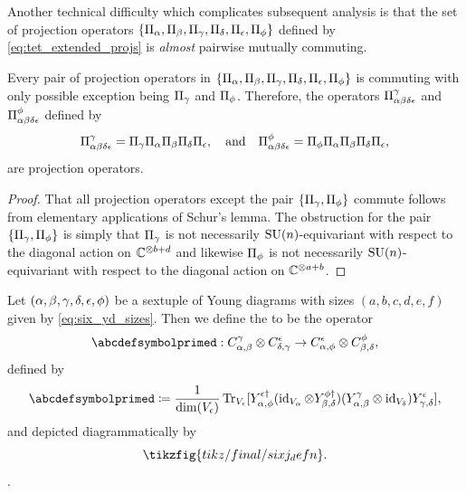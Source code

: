 \documentclass[notitlepage, 10pt]{article}
\begin{document}
Another technical difficulty which complicates subsequent analysis is that the set of projection operators $\{\Pi_{\alpha}, \Pi_{\beta}, \Pi_{\gamma}, \Pi_{\delta}, \Pi_{\epsilon}, \Pi_{\phi}\}$ defined by \cref{eq:tet_extended_projs} is \textit{almost} pairwise mutually commuting.
\begin{lem}
    \label{lem:tet_com_rels}
    Every pair of projection operators in $\{\Pi_{\alpha}, \Pi_{\beta}, \Pi_{\gamma}, \Pi_{\delta}, \Pi_{\epsilon}, \Pi_{\phi}\}$ is commuting with only possible exception being $\Pi_{\gamma}$ and $\Pi_{\phi}$.
    Therefore, the operators $\Pi^{\gamma}_{\alpha\beta\delta\epsilon}$ and $\Pi^{\phi}_{\alpha\beta\delta\epsilon}$ defined by
    \begin{align}
        \label{eq:commuting_extended_projs}
        \begin{split}
            \Pi^{\gamma}_{\alpha\beta\delta\epsilon} = \Pi_{\gamma}\Pi_{\alpha}\Pi_{\beta}\Pi_{\delta}\Pi_{\epsilon}, \quad \text{and} \quad
            \Pi^{\phi}_{\alpha\beta\delta\epsilon} = \Pi_{\phi}\Pi_{\alpha}\Pi_{\beta}\Pi_{\delta}\Pi_{\epsilon},
        \end{split}
    \end{align}
    are projection operators.
\end{lem}
\begin{proof}
    That all projection operators except the pair $\{\Pi_{\gamma}, \Pi_{\phi}\}$ commute follows from elementary applications of Schur's lemma. 
    The obstruction for the pair $\{\Pi_{\gamma}, \Pi_{\phi}\}$ is simply that $\Pi_{\gamma}$ is not necessarily $\operatorname{SU}(n)$-equivariant with respect to the diagonal action on $\mathbb C^{\otimes b+d}$ and likewise $\Pi_{\phi}$ is not necessarily $\operatorname{SU}(n)$-equivariant with respect to the diagonal action on $\mathbb C^{\otimes a+b}$.
\end{proof}

\begin{defn}
    \label{defn:sixj}
    Let $(\alpha,\beta,\gamma,\delta,\epsilon,\phi)$ be a sextuple of Young diagrams with sizes $(a,b,c,d,e,f)$ given by \cref{eq:six_yd_sizes}.
    Then we define the  to be the operator\footnotemark{}
    \begin{equation}
        \abcdefsymbolprimed
        :
        C^{\yc}_{\ya,\yb} \ot C^{\ye}_{\yd,\yc} \to C^{\ye}_{\ya, \yf} \ot C^{\yf}_{\yb,\yd},
    \end{equation}
    defined by
    \begin{equation}
        \label{eq:sixj}
        \abcdefsymbolprimed
        \coloneqq
        \frac{1}{\dim(V_{\ye})}
        \Tr_{V_{\ye}}[
        Y_{\ya,\yf}^{\ye\dagger}
        (\id_{V_{\ya}}\ot Y_{\yb,\yd}^{\yf\dagger})
        (Y_{\ya,\yb}^{\yc}\ot\id_{V_{\yd}})
        Y_{\yc,\yd}^{\ye}
        ],
    \end{equation}
    and depicted diagrammatically by
    \begin{equation}
        \tikzfig{tikz/final/sixj_defn}.
    \end{equation}
    .
\end{defn}
 
\end{document}

